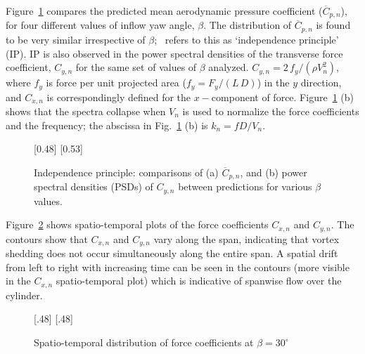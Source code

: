 Figure~\ref{fig:Compared_Yawed_Re20k} compares the predicted mean aerodynamic
pressure coefficient ($\overline{C}_{p,n}$), for four different values of
inflow yaw angle, $\beta$. The distribution of $\overline{C}_{p,n}$ is found to
be very similar irrespective of $\beta$;~\cite{zdravkovich2003flow} refers to
this as `independence principle' (IP). IP is also observed in the power
spectral densities of the transverse force coefficient, $C_{y,n}$ for the same
set of values of $\beta$ analyzed. $C_{y,n}=2\, f_y/ (\rho V^2_n)$, where $f_y$
is force per unit projected area ($f_y = F_y/(L\,D)$) in the $y$ direction, and $C_{x,n}$
is correspondingly defined for the $x-$component of force.
Figure~\ref{fig:Compared_Yawed_Re20k} (b) shows that the spectra collapse when
$V_n$ is used to normalize the force coefficients and the frequency; the
abscissa in Fig.~\ref{fig:Compared_Yawed_Re20k} (b) is $k_n = fD/V_n$.  
%
\begin{figure}[htb!]
  [0.48\linewidth]
    {}
  \hspace*{\fill}
  [0.53\linewidth]
    {}
  \caption{Independence principle: comparisons of (a) $\overline{C}_{p,n}$, and
    (b) power spectral densities (PSDs) of $C_{y,n}$ between predictions for various $\beta$ values.}
\label{fig:Compared_Yawed_Re20k}
\end{figure}

Figure~\ref{fig:Spatial_temporal_CxCyRe20k} shows spatio-temporal plots of the
force coefficients $C_{x,n}$ and $C_{y,n}$. The contours show that $C_{x,n}$
and $C_{y,n}$ vary along the span, indicating that vortex shedding does not
occur simultaneously along the entire span. A spatial drift from left to right
with increasing time can be seen in the contours (more visible in the $C_{x,n}$
spatio-temporal plot) which is indicative of spanwise flow over the cylinder.
%
\begin{figure}[htb!]
    [.48\linewidth]{}
  \hspace*{\fill}
    [.48\linewidth]{}
  \caption{Spatio-temporal distribution of force coefficients at
  $\beta=30^\circ$}
  \label{fig:Spatial_temporal_CxCyRe20k}
\end{figure}

